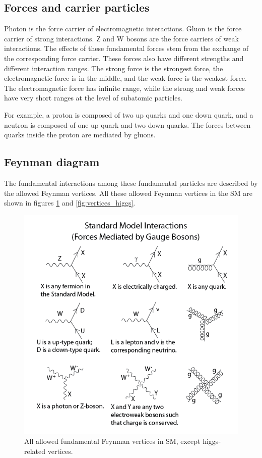 \subsection{Forces and carrier particles}
Photon is the force carrier of electromagnetic interactions.
Gluon is the force carrier of strong interactions.
Z and W bosons are the force carriers of weak interactions.
The effects of these fundamental forces stem from the exchange of the corresponding force carrier.
These forces also have different strengths and different interaction ranges.
The strong force is the strongest force, the electromagnetic force is in the middle, and the weak force is the weakest force.
The electromagnetic force has infinite range, while the strong and weak forces have very short ranges at the level of subatomic particles.

For example, a proton is composed of two up quarks and one down quark, and a neutron is composed of one up quark and two down quarks.
The forces between quarks inside the proton are mediated by gluons.

\subsection{Feynman diagram}
The fundamental interactions among these fundamental particles are described by the allowed Feynman vertices.
All these allowed Feynman vertices in the SM are shown in figures \ref{fig:vertices_SM} and \ref{fig:vertices_higgs}.

\begin{figure}
\centering
\includegraphics[width=\textwidth]{data/photo/theory/vertices_SM.png}
\caption{All allowed fundamental Feynman vertices in SM, except higgs-related vertices. \cite{vertices_SM}}
\label{fig:vertices_SM}
\end{figure}

